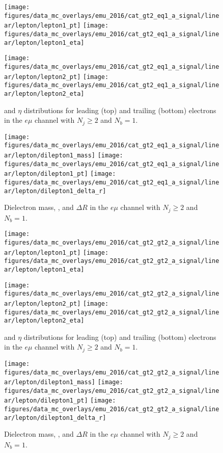 \begin{figure}[htb!]
    \centering
    \texttt{[image: figures/data\_mc\_overlays/emu\_2016/cat\_gt2\_eq1\_a\_signal/linear/lepton/lepton1\_pt]}
    \texttt{[image: figures/data\_mc\_overlays/emu\_2016/cat\_gt2\_eq1\_a\_signal/linear/lepton/lepton1\_eta]}

    \texttt{[image: figures/data\_mc\_overlays/emu\_2016/cat\_gt2\_eq1\_a\_signal/linear/lepton/lepton2\_pt]}
    \texttt{[image: figures/data\_mc\_overlays/emu\_2016/cat\_gt2\_eq1\_a\_signal/linear/lepton/lepton2\_eta]}
    \caption{\pt and $\eta$ distributions for leading (top) and trailing
        (bottom) electrons in the $e\mu$ channel with $N_{j} \geq 2$ and
        $N_{b} = 1$.}
    \label{fig:emu_5_kinematic}
\end{figure}

\begin{figure}[htb!]
    \centering
    \texttt{[image: figures/data\_mc\_overlays/emu\_2016/cat\_gt2\_eq1\_a\_signal/linear/lepton/dilepton1\_mass]}
    \texttt{[image: figures/data\_mc\_overlays/emu\_2016/cat\_gt2\_eq1\_a\_signal/linear/lepton/dilepton1\_pt]}
    \texttt{[image: figures/data\_mc\_overlays/emu\_2016/cat\_gt2\_eq1\_a\_signal/linear/lepton/dilepton1\_delta\_r]}
    \caption{Dielectron mass, \pt, and $\Delta R$ in the $e\mu$ channel
    with $N_{j} \geq 2$ and $N_{b} = 1$.}
    \label{fig:emu_5_dilepton}
\end{figure}

\begin{figure}[htb!]
    \centering
    \texttt{[image: figures/data\_mc\_overlays/emu\_2016/cat\_gt2\_gt2\_a\_signal/linear/lepton/lepton1\_pt]}
    \texttt{[image: figures/data\_mc\_overlays/emu\_2016/cat\_gt2\_gt2\_a\_signal/linear/lepton/lepton1\_eta]}

    \texttt{[image: figures/data\_mc\_overlays/emu\_2016/cat\_gt2\_gt2\_a\_signal/linear/lepton/lepton2\_pt]}
    \texttt{[image: figures/data\_mc\_overlays/emu\_2016/cat\_gt2\_gt2\_a\_signal/linear/lepton/lepton2\_eta]}
    \caption{\pt and $\eta$ distributions for leading (top) and trailing
        (bottom) electrons in the $e\mu$ channel with $N_{j} \geq 2$ and
        $N_{b} = 1$.}
    \label{fig:emu_6_kinematic}
\end{figure}

\begin{figure}[htb!]
    \centering
    \texttt{[image: figures/data\_mc\_overlays/emu\_2016/cat\_gt2\_gt2\_a\_signal/linear/lepton/dilepton1\_mass]}
    \texttt{[image: figures/data\_mc\_overlays/emu\_2016/cat\_gt2\_gt2\_a\_signal/linear/lepton/dilepton1\_pt]}
    \texttt{[image: figures/data\_mc\_overlays/emu\_2016/cat\_gt2\_gt2\_a\_signal/linear/lepton/dilepton1\_delta\_r]}
    \caption{Dielectron mass, \pt, and $\Delta R$ in the $e\mu$ channel
    with $N_{j} \geq 2$ and $N_{b} = 1$.}
    \label{fig:emu_6_dilepton}
\end{figure}

